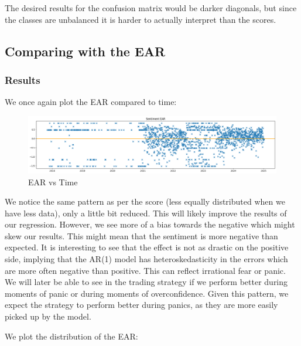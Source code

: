 \documentclass[
  a4paper]{article}
\begin{document}
The desired results for the confusion matrix would be darker diagonals,
but since the classes are unbalanced it is harder to actually interpret
than the scores.

\hypertarget{comparing-with-the-ear}{%
\subsection{Comparing with the EAR}\label{comparing-with-the-ear}}

\hypertarget{results-1}{%
\subsubsection{Results}\label{results-1}}

We once again plot the EAR compared to time:

\begin{figure}

{\centering \includegraphics{graphs/ear_vs_time.png}

}

\caption{EAR vs Time}

\end{figure}

We notice the same pattern as per the score (less equally distributed
when we have less data), only a little bit reduced. This will likely
improve the results of our regression. However, we see more of a bias
towards the negative which might skew our results. This might mean that
the sentiment is more negative than expected. It is interesting to see
that the effect is not as drastic on the positive side, implying that
the AR(1) model has heteroskedasticity in the errors which are more
often negative than positive. This can reflect irrational fear or panic.
We will later be able to see in the trading strategy if we perform
better during moments of panic or during moments of overconfidence.
Given this pattern, we expect the strategy to perform better during
panics, as they are more easily picked up by the model.

We plot the distribution of the EAR:
\end{document}
